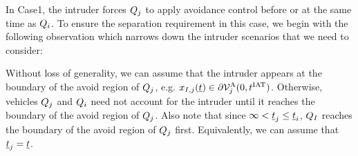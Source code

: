 In Case1, the intruder forces $Q_j$ to apply avoidance control before or at the same time as $Q_i$. %
To ensure the separation requirement in this case, we begin with the following observation which narrows down the intruder scenarios that we need to consider:
\begin{observation} \label{obs1_case1}
Without loss of generality, we can assume that the intruder appears at the boundary of the avoid region of $Q_j$, e.g. $x_{I, j}(\underline{t}) \in \partial \mathcal{V}^{\text{A}}_{j}(0, t^\text{IAT})$. Otherwise, vehicles $Q_j$ and $Q_i$ need not account for the intruder until it reaches the boundary of the avoid region of $Q_j$. Also note that since $\infty < \underline{t}_j \leq \underline{t}_i$, $Q_{I}$ reaches the boundary of the avoid region of $Q_j$ first. Equivalently, we can assume that $\underline{t}_j = \underline{t}$.
\end{observation}